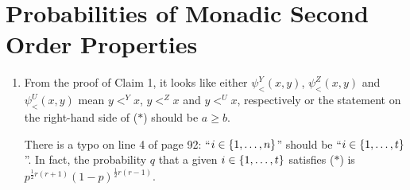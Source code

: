 \setcounter{section}{4}
\section{Probabilities of Monadic Second Order Properties}
\begin{enumerate}[1.]
%
\item {} From the proof of Claim 1, it looks like either $\psi^Y_<(x, y)$, $\psi^Z_<(x, y)$ and $\psi^U_<(x, y)$ mean $y <^Y x$, $y <^Z x$ and $y <^U x$, respectively or the statement on the right-hand side of ($\ast$) should be $a \geq b$.

There is a typo on line 4 of page 92: ``$i \in {\{1, \ldots, n\}}$'' should be ``$i \in {\{1, \ldots, t\}}$''. In fact, the probability $q$ that a given $i \in {\{1, \ldots, t\}}$ satisfies ($\ast$) is $p^{\frac{1}{2}r(r + 1)}(1 - p)^{\frac{1}{2}r(r - 1)}$.
%
\end{enumerate}


